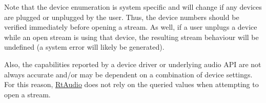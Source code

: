 Note that the device enumeration is system specific and will change if any devices are plugged or unplugged by the user. Thus, the device numbers should be verified immediately before opening a stream. As well, if a user unplugs a device while an open stream is using that device, the resulting stream behaviour will be undefined (a system error will likely be generated).

Also, the capabilities reported by a device driver or underlying audio A\+PI are not always accurate and/or may be dependent on a combination of device settings. For this reason, \mbox{\hyperlink{class_rt_audio}{Rt\+Audio}} does not rely on the queried values when attempting to open a stream. 